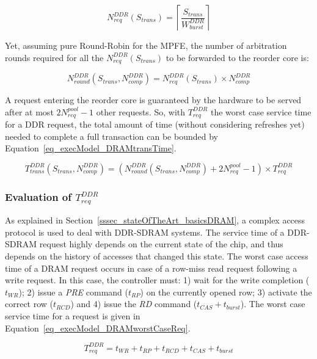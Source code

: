 \documentclass[main.tex]{subfiles}
\begin{document}
\begin{displaymath}
    N_{req}^{DDR}(S_{trans}) = \left\lceil \dfrac{S_{trans}}{W_{burst}^{DDR}} \right\rceil
\end{displaymath}

Yet, assuming pure Round-Robin for the MPFE, the number of arbitration rounds
required for all the $N_{req}^{DDR}(S_{trans})$ to be forwarded to the reorder
core is: 

\begin{displaymath}
    N_{round}^{DDR}(S_{trans}, N_{comp}^{DDR}) = N_{req}^{DDR}(S_{trans}) \times N_{comp}^{DDR}
\end{displaymath}


A request entering the reorder core is guaranteed by the hardware to be served
after at most $2 N_{req}^{pool} -1$ other requests. So, with $T_{req}^{DDR}$
the worst case service time for a DDR request, the total amount of time
(without considering refreshes yet) needed to complete a full transaction can
be bounded by Equation~\ref{eq_execModel_DRAMtransTime}.


\begin{equation}
    T_{trans}^{DDR} (S_{trans}, N_{comp}^{DDR}) = 
    (N_{round}^{DDR}(S_{trans}, N_{comp}^{DDR}) + 2 N_{req}^{pool} -1) \times T_{req}^{DDR}
    \label{eq_execModel_DRAMtransTime}
\end{equation}


\subsubsection{Evaluation of $T_{req}^{DDR}$}
As explained in Section~\ref{sssec_stateOfTheArt_basicsDRAM}, a complex access
protocol is used to deal with DDR-SDRAM systems. The service time of a
DDR-SDRAM request highly depends on the current state of the chip, and thus
depends on the history of accesses that changed this state. The worst case
access time of a DRAM request occurs in case of a row-miss read request
following a write request. In this case, the controller must: 1) wait for the
write completion ($t_{WR}$); 2) issue a \emph{PRE} command ($t_{RP}$) on the
currently opened row; 3) activate the correct row ($t_{RCD}$) and 4) issue the
\emph{RD} command ($t_{CAS} + t_{burst}$). The worst case service time for a
request is given in Equation~\ref{eq_execModel_DRAMworstCaseReq}.

\begin{equation}
    T_{req}^{DDR} = 
    t_{WR} +
    t_{RP} +
    t_{RCD} +
    t_{CAS} +
    t_{burst}
    \label{eq_execModel_DRAMworstCaseReq}
\end{equation}
\end{document}
